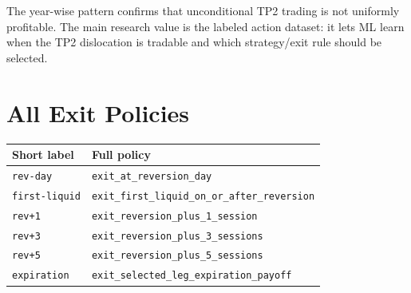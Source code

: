 \documentclass[11pt]{article}
\begin{document}
The year-wise pattern confirms that unconditional TP2 trading is not uniformly profitable. The
main research value is the labeled action dataset: it lets ML learn when the TP2 dislocation is
tradable and which strategy/exit rule should be selected.

\section{All Exit Policies}

\begin{center}
\begin{tabularx}{0.96\linewidth}{lX}
\toprule
Short label & Full policy \\
\midrule
\texttt{rev-day} & \texttt{exit\_at\_reversion\_day} \\
\texttt{first-liquid} & \texttt{exit\_first\_liquid\_on\_or\_after\_reversion} \\
\texttt{rev+1} & \texttt{exit\_reversion\_plus\_1\_session} \\
\texttt{rev+3} & \texttt{exit\_reversion\_plus\_3\_sessions} \\
\texttt{rev+5} & \texttt{exit\_reversion\_plus\_5\_sessions} \\
\texttt{expiration} & \texttt{exit\_selected\_leg\_expiration\_payoff} \\
\bottomrule
\end{tabularx}
\end{center}
\end{document}

